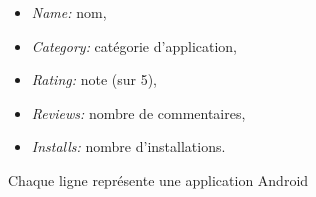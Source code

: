 \documentclass[svgnames,11pt]{beamer}
\begin{document}
\begin{frame}

    \begin{itemize}
        \item \emph{Name:} nom,
        \item \emph{Category:} catégorie d'application,
        \item \emph{Rating:} note (sur 5),
        \item \emph{Reviews:} nombre de commentaires,
        \item \emph{Installs:} nombre d'installations.

    \end{itemize}
    \begin{aretenir}[Remarque]
        Chaque ligne représente une application Android
    \end{aretenir}
\end{frame}
\end{document}
